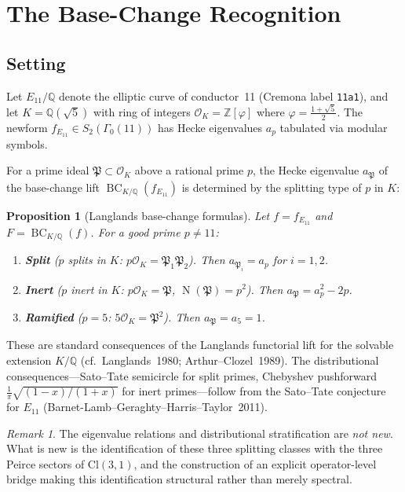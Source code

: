 \documentclass[11pt,a4paper]{article}
\theoremstyle{plain}
\newtheorem{proposition}[theorem]{Proposition}
\theoremstyle{definition}
\theoremstyle{remark}
\newtheorem{remark}[theorem]{Remark}
\numberwithin{equation}{section}
\providecommand{\Cl}{\mathrm{Cl}}
\providecommand{\ZZ}{\mathbb{Z}}
\providecommand{\QQ}{\mathbb{Q}}
\providecommand{\cO}{\mathcal{O}}
\providecommand{\fP}{\mathfrak{P}}
\DeclareMathOperator{\BC}{BC}
\DeclareMathOperator{\Nm}{N}
\begin{document}
\section{The Base-Change Recognition}\label{sec:base-change}

\subsection{Setting}

Let $E_{11}/\QQ$ denote the elliptic curve of conductor~11 (Cremona label
\texttt{11a1}), and let $K = \QQ(\sqrt{5})$ with ring of integers
$\cO_K = \ZZ[\varphi]$ where $\varphi = \tfrac{1+\sqrt{5}}{2}$.  The
newform $f_{E_{11}} \in S_2(\Gamma_0(11))$ has Hecke eigenvalues $a_p$
tabulated via modular symbols.

For a prime ideal $\fP \subset \cO_K$ above a rational prime $p$, the Hecke
eigenvalue $a_\fP$ of the base-change lift $\BC_{K/\QQ}(f_{E_{11}})$ is
determined by the splitting type of $p$ in $K$:

\begin{proposition}[Langlands base-change formulas]\label{prop:base-change}
Let $f = f_{E_{11}}$ and $F = \BC_{K/\QQ}(f)$.  For a good prime $p \neq 11$:
\begin{enumerate}[label=(\roman*)]
\item \textbf{Split} ($p$ splits in $K$: $p\cO_K = \fP_1 \fP_2$).
  Then $a_{\fP_i} = a_p$ for $i = 1, 2$.
\item \textbf{Inert} ($p$ inert in $K$: $p\cO_K = \fP$, $\Nm(\fP) = p^2$).
  Then $a_\fP = a_p^2 - 2p$.
\item \textbf{Ramified} ($p = 5$: $5\cO_K = \fP^2$).
  Then $a_\fP = a_5 = 1$.
\end{enumerate}
\end{proposition}

These are standard consequences of the Langlands functorial lift for the
solvable extension $K/\QQ$ (cf.~Langlands~1980; Arthur--Clozel~1989).
The distributional consequences---Sato--Tate semicircle for split primes,
Chebyshev pushforward $\frac{1}{\pi}\sqrt{(1-x)/(1+x)}$ for inert
primes---follow from the Sato--Tate conjecture for $E_{11}$
(Barnet-Lamb--Geraghty--Harris--Taylor~2011).

\begin{remark}
The eigenvalue relations and distributional stratification are
\emph{not new}.  What is new is the identification of these three
splitting classes with the three Peirce sectors of $\Cl(3,1)$, and the
construction of an explicit operator-level bridge making this
identification structural rather than merely spectral.
\end{remark}
\end{document}
